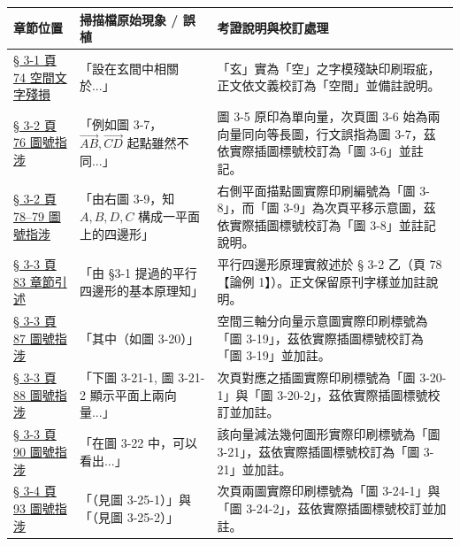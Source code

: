 \documentclass[a4paper,12pt,twoside]{article}
\begin{document}
\begin{table}[H]
\centering
\small
\renewcommand{\arraystretch}{1.35}
\begin{tabularx}{\textwidth}{|p{3.2cm}|p{3.8cm}|X|}
\hline
\textbf{章節位置} & \textbf{掃描檔原始現象 / 誤植} & \textbf{考證說明與校訂處理} \\ \hline

\hyperref[note:b3s-ch3-p74-space-font]{§ 3-1 頁 74 空間文字殘損} & 
「設在玄間中相關於...」 & 
「玄」實為「空」之字模殘缺印刷瑕疵，正文依文義校訂為「空間」並備註說明。 \\ \hline

\hyperref[note:b3s-ch3-p76-fig-ref]{§ 3-2 頁 76 圖號指涉} & 
「例如圖 3-7，$\vec{AB},\vec{CD}$ 起點雖然不同...」 & 
圖 3-5 原印為單向量，次頁圖 3-6 始為兩向量同向等長圖，行文誤指為圖 3-7，茲依實際插圖標號校訂為「圖 3-6」並註記。 \\ \hline

\hyperref[note:b3s-ch3-p78-fig3-9]{§ 3-2 頁 78--79 圖號指涉} & 
「由右圖 3-9，知 $A,B,D,C$ 構成一平面上的四邊形」 & 
右側平面描點圖實際印刷編號為「圖 3-8」，而「圖 3-9」為次頁平移示意圖，茲依實際插圖標號校訂為「圖 3-8」並註記說明。 \\ \hline

\hyperref[note:b3s-ch3-p83-sec-ref]{§ 3-3 頁 83 章節引述} & 
「由 §3-1 提過的平行四邊形的基本原理知」 & 
平行四邊形原理實敘述於 § 3-2 乙（頁 78【論例 1】）。正文保留原刊字樣並加註說明。 \\ \hline

\hyperref[note:b3s-ch3-p87-fig-ref]{§ 3-3 頁 87 圖號指涉} & 
「其中（如圖 3-20）」 & 
空間三軸分向量示意圖實際印刷標號為「圖 3-19」，茲依實際插圖標號校訂為「圖 3-19」並加註。 \\ \hline

\hyperref[note:b3s-ch3-p88-fig-ref]{§ 3-3 頁 88 圖號指涉} & 
「下圖 3-21-1, 圖 3-21-2 顯示平面上兩向量...」 & 
次頁對應之插圖實際印刷標號為「圖 3-20-1」與「圖 3-20-2」，茲依實際插圖標號校訂並加註。 \\ \hline

\hyperref[note:b3s-ch3-p90-fig-ref]{§ 3-3 頁 90 圖號指涉} & 
「在圖 3-22 中，可以看出...」 & 
該向量減法幾何圖形實際印刷標號為「圖 3-21」，茲依實際插圖標號校訂為「圖 3-21」並加註。 \\ \hline

\hyperref[note:b3s-ch3-p93-fig-ref]{§ 3-4 頁 93 圖號指涉} & 
「（見圖 3-25-1）」與「（見圖 3-25-2）」 & 
次頁兩圖實際印刷標號為「圖 3-24-1」與「圖 3-24-2」，茲依實際插圖標號校訂並加註。 \\ \hline


\end{tabularx}
\end{table}
\end{document}
